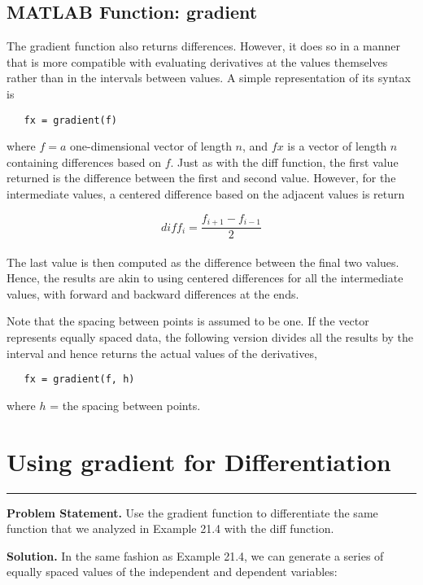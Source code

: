 \documentclass[../main.tex]{subfiles}
\begin{document}
\subsection{MATLAB Function: gradient }
The gradient function also returns differences. However, it does so in a manner that is
more compatible with evaluating derivatives at the values themselves rather than in the
intervals between values. A simple representation of its syntax is 
\begin{verbatim}
   fx = gradient(f)
\end{verbatim}
where $f = a$ one-dimensional vector of length $n$, and $fx$ is a vector of length $n$ containing
differences based on $f$. Just as with the diff function, the first value returned is the difference between the first and second value. However, for the intermediate values, a centered difference based on the adjacent values is return

\begin{equation}
	\tag{21.28}
	diff_{i} = \dfrac{f_{i+1} - f_{i-1}}{2}
\end{equation}\\
The last value is then computed as the difference between the final two values. Hence, the
results are akin to using centered differences for all the intermediate values, with forward
and backward differences at the ends. 

Note that the spacing between points is assumed to be one. If the vector represents
equally spaced data, the following version divides all the results by the interval and hence
returns the actual values of the derivatives,
\begin{verbatim}
   fx = gradient(f, h)
\end{verbatim}
where $h$ = the spacing between points.

\vspace{0,6in}

\section{Using gradient for Differentiation}

\vspace{0,1in}
\hrule
\vspace{0,1in}

\textbf{Problem Statement.} Use the gradient function to differentiate the same function that
we analyzed in Example 21.4 with the diff function.

\textbf{Solution.} In the same fashion as Example 21.4, we can generate a series of equally
spaced values of the independent and dependent variables:
\end{document}
